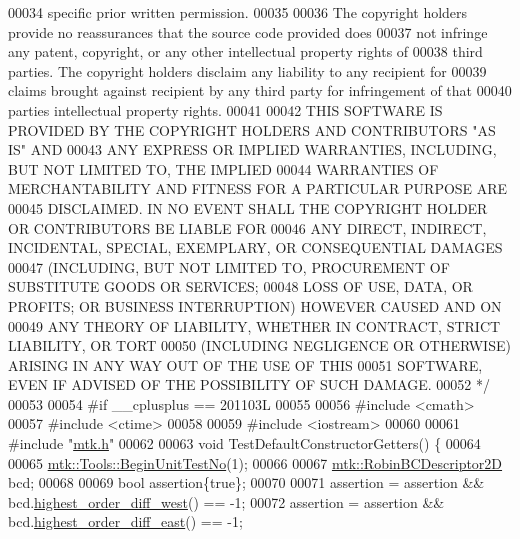 \begin{DoxyCode}
00034 \textcolor{comment}{specific prior written permission.}
00035 \textcolor{comment}{}
00036 \textcolor{comment}{The copyright holders provide no reassurances that the source code provided does}
00037 \textcolor{comment}{not infringe any patent, copyright, or any other intellectual property rights of}
00038 \textcolor{comment}{third parties. The copyright holders disclaim any liability to any recipient for}
00039 \textcolor{comment}{claims brought against recipient by any third party for infringement of that}
00040 \textcolor{comment}{parties intellectual property rights.}
00041 \textcolor{comment}{}
00042 \textcolor{comment}{THIS SOFTWARE IS PROVIDED BY THE COPYRIGHT HOLDERS AND CONTRIBUTORS "AS IS" AND}
00043 \textcolor{comment}{ANY EXPRESS OR IMPLIED WARRANTIES, INCLUDING, BUT NOT LIMITED TO, THE IMPLIED}
00044 \textcolor{comment}{WARRANTIES OF MERCHANTABILITY AND FITNESS FOR A PARTICULAR PURPOSE ARE}
00045 \textcolor{comment}{DISCLAIMED. IN NO EVENT SHALL THE COPYRIGHT HOLDER OR CONTRIBUTORS BE LIABLE FOR}
00046 \textcolor{comment}{ANY DIRECT, INDIRECT, INCIDENTAL, SPECIAL, EXEMPLARY, OR CONSEQUENTIAL DAMAGES}
00047 \textcolor{comment}{(INCLUDING, BUT NOT LIMITED TO, PROCUREMENT OF SUBSTITUTE GOODS OR SERVICES;}
00048 \textcolor{comment}{LOSS OF USE, DATA, OR PROFITS; OR BUSINESS INTERRUPTION) HOWEVER CAUSED AND ON}
00049 \textcolor{comment}{ANY THEORY OF LIABILITY, WHETHER IN CONTRACT, STRICT LIABILITY, OR TORT}
00050 \textcolor{comment}{(INCLUDING NEGLIGENCE OR OTHERWISE) ARISING IN ANY WAY OUT OF THE USE OF THIS}
00051 \textcolor{comment}{SOFTWARE, EVEN IF ADVISED OF THE POSSIBILITY OF SUCH DAMAGE.}
00052 \textcolor{comment}{*/}
00053 
00054 \textcolor{preprocessor}{#if \_\_cplusplus == 201103L}
00055 
00056 \textcolor{preprocessor}{#include <cmath>}
00057 \textcolor{preprocessor}{#include <ctime>}
00058 
00059 \textcolor{preprocessor}{#include <iostream>}
00060 
00061 \textcolor{preprocessor}{#include "\hyperlink{mtk_8h}{mtk.h}"}
00062 
00063 \textcolor{keywordtype}{void} TestDefaultConstructorGetters() \{
00064 
00065   \hyperlink{classmtk_1_1Tools_afc29ecaf337a13ed2e817d3890a5a441}{mtk::Tools::BeginUnitTestNo}(1);
00066 
00067   \hyperlink{classmtk_1_1RobinBCDescriptor2D}{mtk::RobinBCDescriptor2D} bcd;
00068 
00069   \textcolor{keywordtype}{bool} assertion\{\textcolor{keyword}{true}\};
00070 
00071   assertion = assertion && bcd.\hyperlink{classmtk_1_1RobinBCDescriptor2D_ac75fc5f402e3f6e6d4f1e253f8ada98c}{highest\_order\_diff\_west}() == -1;
00072   assertion = assertion && bcd.\hyperlink{classmtk_1_1RobinBCDescriptor2D_aebe62f9ae39b02f9c029257d6e6381af}{highest\_order\_diff\_east}() == -1;

\end{DoxyCode}
